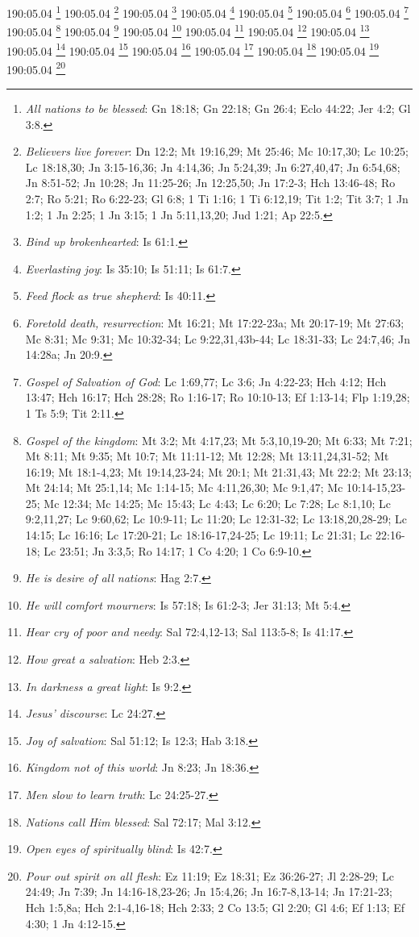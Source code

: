 190:05.04 \footnote{\textit{All nations to be blessed}: Gn 18:18; Gn 22:18; Gn 26:4; Eclo 44:22; Jer 4:2; Gl 3:8.}
190:05.04 \footnote{\textit{Believers live forever}: Dn 12:2; Mt 19:16,29; Mt 25:46; Mc 10:17,30; Lc 10:25; Lc 18:18,30; Jn 3:15-16,36; Jn 4:14,36; Jn 5:24,39; Jn 6:27,40,47; Jn 6:54,68; Jn 8:51-52; Jn 10:28; Jn 11:25-26; Jn 12:25,50; Jn 17:2-3; Hch 13:46-48; Ro 2:7; Ro 5:21; Ro 6:22-23; Gl 6:8; 1 Ti 1:16; 1 Ti 6:12,19; Tit 1:2; Tit 3:7; 1 Jn 1:2; 1 Jn 2:25; 1 Jn 3:15; 1 Jn 5:11,13,20; Jud 1:21; Ap 22:5.}
190:05.04 \footnote{\textit{Bind up brokenhearted}: Is 61:1.}
190:05.04 \footnote{\textit{Everlasting joy}: Is 35:10; Is 51:11; Is 61:7.}
190:05.04 \footnote{\textit{Feed flock as true shepherd}: Is 40:11.}
190:05.04 \footnote{\textit{Foretold death, resurrection}: Mt 16:21; Mt 17:22-23a; Mt 20:17-19; Mt 27:63; Mc 8:31; Mc 9:31; Mc 10:32-34; Lc 9:22,31,43b-44; Lc 18:31-33; Lc 24:7,46; Jn 14:28a; Jn 20:9.}
190:05.04 \footnote{\textit{Gospel of Salvation of God}: Lc 1:69,77; Lc 3:6; Jn 4:22-23; Hch 4:12; Hch 13:47; Hch 16:17; Hch 28:28; Ro 1:16-17; Ro 10:10-13; Ef 1:13-14; Flp 1:19,28; 1 Ts 5:9; Tit 2:11.}
190:05.04 \footnote{\textit{Gospel of the kingdom}: Mt 3:2; Mt 4:17,23; Mt 5:3,10,19-20; Mt 6:33; Mt 7:21; Mt 8:11; Mt 9:35; Mt 10:7; Mt 11:11-12; Mt 12:28; Mt 13:11,24,31-52; Mt 16:19; Mt 18:1-4,23; Mt 19:14,23-24; Mt 20:1; Mt 21:31,43; Mt 22:2; Mt 23:13; Mt 24:14; Mt 25:1,14; Mc 1:14-15; Mc 4:11,26,30; Mc 9:1,47; Mc 10:14-15,23-25; Mc 12:34; Mc 14:25; Mc 15:43; Lc 4:43; Lc 6:20; Lc 7:28; Lc 8:1,10; Lc 9:2,11,27; Lc 9:60,62; Lc 10:9-11; Lc 11:20; Lc 12:31-32; Lc 13:18,20,28-29; Lc 14:15; Lc 16:16; Lc 17:20-21; Lc 18:16-17,24-25; Lc 19:11; Lc 21:31; Lc 22:16-18; Lc 23:51; Jn 3:3,5; Ro 14:17; 1 Co 4:20; 1 Co 6:9-10.}
190:05.04 \footnote{\textit{He is desire of all nations}: Hag 2:7.}
190:05.04 \footnote{\textit{He will comfort mourners}: Is 57:18; Is 61:2-3; Jer 31:13; Mt 5:4.}
190:05.04 \footnote{\textit{Hear cry of poor and needy}: Sal 72:4,12-13; Sal 113:5-8; Is 41:17.}
190:05.04 \footnote{\textit{How great a salvation}: Heb 2:3.}
190:05.04 \footnote{\textit{In darkness a great light}: Is 9:2.}
190:05.04 \footnote{\textit{Jesus' discourse}: Lc 24:27.}
190:05.04 \footnote{\textit{Joy of salvation}: Sal 51:12; Is 12:3; Hab 3:18.}
190:05.04 \footnote{\textit{Kingdom not of this world}: Jn 8:23; Jn 18:36.}
190:05.04 \footnote{\textit{Men slow to learn truth}: Lc 24:25-27.}
190:05.04 \footnote{\textit{Nations call Him blessed}: Sal 72:17; Mal 3:12.}
190:05.04 \footnote{\textit{Open eyes of spiritually blind}: Is 42:7.}
190:05.04 \footnote{\textit{Pour out spirit on all flesh}: Ez 11:19; Ez 18:31; Ez 36:26-27; Jl 2:28-29; Lc 24:49; Jn 7:39; Jn 14:16-18,23-26; Jn 15:4,26; Jn 16:7-8,13-14; Jn 17:21-23; Hch 1:5,8a; Hch 2:1-4,16-18; Hch 2:33; 2 Co 13:5; Gl 2:20; Gl 4:6; Ef 1:13; Ef 4:30; 1 Jn 4:12-15.}
